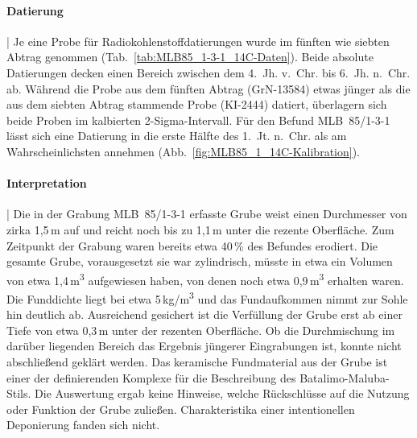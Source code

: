 \paragraph{Datierung}\hspace{-.5em}|\hspace{.5em}%
Je eine Probe für Radiokohlenstoffdatierungen wurde im fünften wie siebten Abtrag genommen (Tab.~\ref{tab:MLB85_1-3-1_14C-Daten}). Beide absolute Datierungen decken einen Bereich zwischen dem 4.~Jh. v.~Chr. bis 6.~Jh. n.~Chr. ab. Während die Probe aus dem fünften Abtrag (GrN-13584) etwas jünger als die aus dem siebten Abtrag stammende Probe (KI-2444) datiert, überlagern sich beide Proben im kalbierten 2-Sigma-Intervall. Für den Befund MLB~85/1-3-1 lässt sich eine Datierung in die erste Hälfte des 1.~Jt. n.~Chr. als am Wahrscheinlichsten annehmen (Abb.~\ref{fig:MLB85_1_14C-Kalibration}). 

\paragraph{Interpretation}\hspace{-.5em}|\hspace{.5em}%
Die in der Grabung MLB~85/1-3-1 erfasste Grube weist einen Durchmesser von zirka 1,5\,m auf und reicht noch bis zu 1,1\,m unter die rezente Oberfläche. Zum Zeitpunkt der Grabung waren bereits etwa 40\,\% des Befundes erodiert. Die gesamte Grube, vorausgesetzt sie war zylindrisch, müsste in etwa ein Volumen von etwa 1,4\,m\textsuperscript{3} aufgewiesen haben, von denen noch etwa 0,9\,m\textsuperscript{3} erhalten waren. Die Funddichte liegt bei etwa 5\,kg/m\textsuperscript{3} und das Fundaufkommen nimmt zur Sohle hin deutlich ab. Ausreichend gesichert ist die Verfüllung der Grube erst ab einer Tiefe von etwa 0,3\,m unter der rezenten Oberfläche. Ob die Durchmischung im darüber liegenden Bereich das Ergebnis jüngerer Eingrabungen ist, konnte nicht abschließend geklärt werden. Das keramische Fundmaterial aus der Grube ist einer der definierenden Komplexe für die Beschreibung des Batalimo-Maluba-Stils. Die Auswertung ergab keine Hinweise, welche Rückschlüsse auf die Nutzung oder Funktion der Grube zuließen. Charakteristika einer intentionellen Deponierung \parencite[siehe][]{Wotzka.1993} fanden sich nicht.